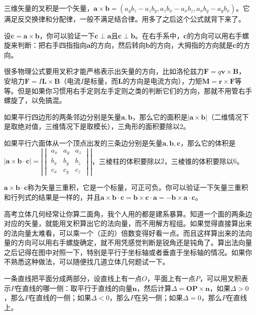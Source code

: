 三维矢量的叉积是一个矢量，$\mathbf{a} \times \mathbf{b}=(a_y b_z-a_z b_y,a_z b_x-a_x b_z,a_x b_y-a_y b_x)$。它满足反交换律和分配律，一般不满足结合律。用多了之后这个公式就背下来了。

设$\mathbf{c}=\mathbf{a} \times \mathbf{b}$，你可以验证一下$\mathbf{c} \perp \mathbf{a}$且$\mathbf{c} \perp \mathbf{b}$。在右手系中，$\mathbf{c}$的方向可以用右手螺旋来判断：把右手四指指向$\mathbf{a}$的方向，然后转向$\mathbf{b}$的方向，大拇指的方向就是$\mathbf{c}$的方向。

很多物理公式要用叉积才能严格表示出矢量的方向，比如洛伦兹力$\mathbf{F}=q \mathbf{v} \times \mathbf{B}$，安培力$\mathbf{F}=I \mathbf{L} \times \mathbf{B}$（电流$I$是标量，而$\mathbf{L}$的方向是电流方向），力矩$\mathbf{M}=\mathbf{r} \times \mathbf{F}$等等。但是如果你习惯用右手定则左手定则之类的判断它们的方向，那就不用管右手螺旋了，以免搞混。

如果平行四边形的两条邻边分别是矢量$\mathbf{a},\mathbf{b}$，那么它的面积是$|\mathbf{a} \times \mathbf{b}|$（二维情况下是取绝对值，三维情况下是取模长），三角形的面积要除以$2$。

如果平行六面体从一个顶点出发的三条边分别是矢量$\mathbf{a},\mathbf{b},\mathbf{c}$，那么它的体积是$|\mathbf{a} \times \mathbf{b} \cdot \mathbf{c}|=\left| \begin{vmatrix}
a_x & a_y & a_z \\
b_x & b_y & b_z \\
c_x & c_y & c_z
\end{vmatrix} \right|$，三棱柱的体积要除以$2$，三棱锥的体积要除以$6$。

$\mathbf{a} \times \mathbf{b} \cdot \mathbf{c}$称为矢量三重积，它是一个标量，可正可负。你可以验证一下矢量三重积和行列式的结果是一样的，并且$\mathbf{a} \times \mathbf{b} \cdot \mathbf{c}=\mathbf{b} \times \mathbf{c} \cdot \mathbf{a}=-\mathbf{b} \times \mathbf{a} \cdot \mathbf{c}$。

高考立体几何经常让你算二面角，我个人用的都是建系暴算。知道一个面的两条边对应的矢量，就能用叉积算出它的法向量，而不用解方程组。如果觉得直接算出来的法向量太难看，可以乘一个（正的）倍数变得好看一点。而且这样算出来的法向量的方向可以用右手螺旋确定，就不用凭感觉判断是锐角还是钝角了。算出法向量之后记得在图中对照一下，特别是平行于坐标轴或者垂直于坐标轴的情况。如果你不熟悉这种做法，可以随便找几道立体几何题试一下。

一条直线把平面分成两部分，设直线上有一点$O$，平面上有一点$P$，可以用叉积表示$P$在直线的哪一侧：取平行于直线的向量$\mathbf{n}$，然后计算$\Delta=\mathbf{OP} \times \mathbf{n}$，如果$\Delta>0$，那么$P$在直线的一侧；如果$\Delta<0$，那么$P$在另一侧；如果$\Delta=0$，那么$P$在直线上。

